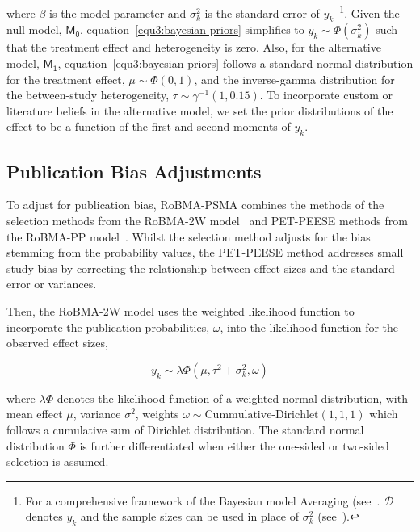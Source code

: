 \documentclass[12pt, english]{article}
\begin{document}
    where $\beta$ is the model parameter and $\sigma_k^2$ is the standard error of $y_k$~\footnote{For a comprehensive framework of the Bayesian model Averaging (see~\parencite{fragoso2018, gronau2021, hinne2020}. $\mathcal{D}$ denotes $y_k$ and the sample sizes can be used in place of $\sigma_k^{2}$ (see~\cite{bem2011}).}. Given the null model, $\mathsf{M_0}$, equation~\ref{equ3:bayesian-priors} simplifies to $y_k \sim \Phi(\sigma_k^{2})$ such that the treatment effect and heterogeneity is zero. Also, for the alternative model, $\mathsf{M_1}$, equation~\ref{equ3:bayesian-priors} follows a standard normal distribution for the treatment effect, $\mu \sim \Phi(0,1)$, and the inverse-gamma distribution for the between-study heterogeneity, $\tau \sim \gamma^{-1}(1,0.15)$. To incorporate custom or literature beliefs in the alternative model, we set the prior distributions of the effect to be a function of the first and second moments of $y_k$.

    \subsection{Publication Bias Adjustments}\label{subsec1.0.1:publication-bias-adjustments}
    To adjust for publication bias, RoBMA-PSMA combines the methods of the selection methods from the RoBMA-2W model~\parencite{maier2022} and PET-PEESE methods from the RoBMA-PP model~\parencite{bartos2021, bartos2022}. Whilst the selection method adjusts for the bias stemming from the probability values, the PET-PEESE method addresses small study bias by correcting the relationship between effect sizes and the standard error or variances.

    Then, the RoBMA-2W model uses the weighted likelihood function to incorporate the publication probabilities, $\omega$, into the likelihood function for the observed effect sizes,

    \begin{equation}
        \label{equ4:robma-2w}
        y_k \sim \lambda\Phi \left(\mu, \tau^{2} + \sigma_k^{2}, \omega \right)
    \end{equation}

    where $\lambda \Phi$ denotes the likelihood function of a weighted normal distribution, with mean effect $\mu$, variance $\sigma^2$, weights $\omega \sim \text{Cummulative-Dirichlet}(1,1,1)$ which follows a cumulative sum of Dirichlet distribution. The standard normal distribution $\Phi$ is further differentiated when either the one-sided or two-sided selection is assumed.
\end{document}
